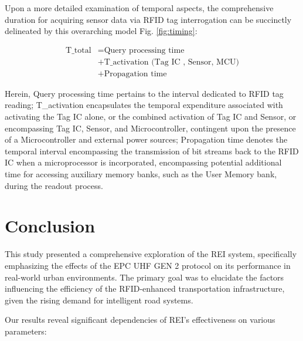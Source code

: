 \documentclass[lettersize,journal]{IEEEtran}
\begin{document}
Upon a more detailed examination of temporal aspects, the comprehensive duration for acquiring sensor data via RFID tag interrogation can be succinctly delineated by this overarching model Fig. \ref{fig:timing}:  

\begin{equation}
\begin{aligned}
\text{T\_total} &= \text{Query processing time} \\ &+ \text{T\_activation (Tag IC , Sensor, MCU)} \\
&+ \text{Propagation time} 
\end{aligned}
\end{equation}

Herein, Query processing time pertains to the interval dedicated to RFID tag reading; T\_activation encapsulates the temporal expenditure associated with activating the Tag IC alone, or the combined activation of Tag IC and Sensor, or encompassing Tag IC, Sensor, and Microcontroller, contingent upon the presence of a Microcontroller and external power sources; Propagation time denotes the temporal interval encompassing the transmission of bit streams back to the RFID IC when a microprocessor is incorporated, encompassing potential additional time for accessing auxiliary memory banks, such as the User Memory bank, during the readout process.




\section{Conclusion}
This study presented a comprehensive exploration of the REI system, specifically emphasizing the effects of the EPC UHF GEN 2 protocol on its performance in real-world urban environments. The primary goal was to elucidate the factors influencing the efficiency of the RFID-enhanced transportation infrastructure, given the rising demand for intelligent road systems.

Our results reveal significant dependencies of REI's effectiveness on various parameters:
\end{document}
